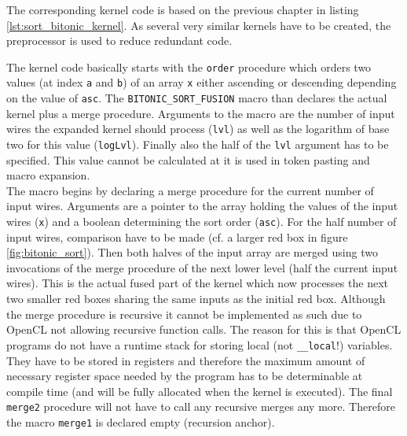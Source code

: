 The corresponding kernel code is based on the previous chapter in listing \ref{lst:sort_bitonic_kernel}. As several very similar kernels have to be created, the preprocessor is used to reduce redundant code.



The kernel code basically starts with the \lstinline!order! procedure which orders two values (at index \lstinline!a! and \lstinline!b!) of an array \lstinline!x! either ascending or descending depending on the value of \lstinline!asc!. The \lstinline!BITONIC_SORT_FUSION! macro than declares the actual kernel plus a merge procedure. Arguments to the macro are the number of input wires the expanded kernel should process (\lstinline!lvl!) as well as the logarithm of base two for this value (\lstinline!logLvl!). Finally also the half of the \lstinline!lvl! argument has to be specified. This value cannot be calculated at it is used in token pasting and macro expansion. \\
The macro begins by declaring a merge procedure for the current number of input wires. Arguments are a pointer to the array holding the values of the input wires (\lstinline!x!) and a boolean determining the sort order (\lstinline!asc!). For the half number of input wires, comparison have to be made (cf. a larger red box in figure \ref{fig:bitonic_sort}). Then both halves of the input array are merged using two invocations of the merge procedure of the next lower level (half the current input wires). This is the actual fused part of the kernel which now processes the next two smaller red boxes sharing the same inputs as the initial red box. Although the merge procedure is recursive it cannot be implemented as such due to OpenCL not allowing recursive function calls. The reason for this is that OpenCL programs do not have a runtime stack for storing local (not \lstinline!__local!!) variables. They have to be stored in registers and therefore the maximum amount of necessary register space needed by the program has to be determinable at compile time (and will be fully allocated when the kernel is executed). The final \lstinline!merge2! procedure will not have to call any recursive merges any more. Therefore the macro \lstinline!merge1! is declared empty (recursion anchor). \\
